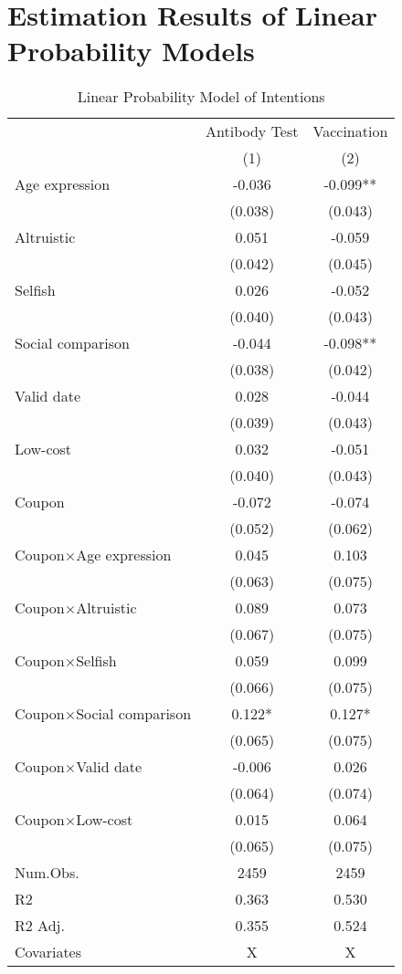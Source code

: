 \documentclass[
  11pt,
  a4paper,
]{article}
\begin{document}
\clearpage

\hypertarget{estimation-results-of-linear-probability-models}{%
\section{Estimation Results of Linear Probability Models}\label{estimation-results-of-linear-probability-models}}

\begin{table}

\caption{\label{tab:int-reg}Linear Probability Model of Intentions}
\centering
\begin{tabular}[t]{lcc}
\toprule
\multicolumn{1}{c}{ } & \multicolumn{1}{c}{Antibody Test} & \multicolumn{1}{c}{Vaccination} \\
\cmidrule(l{3pt}r{3pt}){2-2} \cmidrule(l{3pt}r{3pt}){3-3}
  & (1) & (2)\\
\midrule
Age expression & -0.036 & -0.099**\\
 & (0.038) & (0.043)\\
Altruistic & 0.051 & -0.059\\
 & (0.042) & (0.045)\\
Selfish & 0.026 & -0.052\\
 & (0.040) & \vphantom{1} (0.043)\\
Social comparison & -0.044 & -0.098**\\
 & (0.038) & (0.042)\\
Valid date & 0.028 & -0.044\\
 & (0.039) & (0.043)\\
Low-cost & 0.032 & -0.051\\
 & (0.040) & (0.043)\\
Coupon & -0.072 & -0.074\\
 & (0.052) & (0.062)\\
Coupon×Age expression & 0.045 & 0.103\\
 & (0.063) & (0.075)\\
Coupon×Altruistic & 0.089 & 0.073\\
 & (0.067) & (0.075)\\
Coupon×Selfish & 0.059 & 0.099\\
 & (0.066) & (0.075)\\
Coupon×Social comparison & 0.122* & 0.127*\\
 & (0.065) & \vphantom{1} (0.075)\\
Coupon×Valid date & -0.006 & 0.026\\
 & (0.064) & (0.074)\\
Coupon×Low-cost & 0.015 & 0.064\\
 & (0.065) & (0.075)\\
\midrule
Num.Obs. & 2459 & 2459\\
R2 & 0.363 & 0.530\\
R2 Adj. & 0.355 & 0.524\\
Covariates & X & X\\
\bottomrule
\end{tabular}
\end{table}
\end{document}
